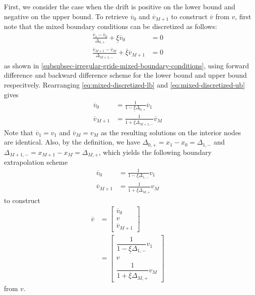 \documentclass[11pt]{article}
\theoremstyle{definition}
\begin{document}
First, we consider the case when the drift is positive on the lower bound and negative on the upper bound. To retrieve $\overline{v}_0 $ and $\overline{v}_{M+1}$ to construct $\overline{v}$ from $v$, first note that the mixed boundary conditions can be discretized as follows:
\begin{align}
\frac{\overline{v}_1 - \overline{v}_0}{\Delta_{0,+}} + \underline{\xi} \overline{v}_0 &= 0 \label{eq:mixed-discretized-lb} \\
\frac{\overline{v}_{M+1} - \overline{v}_M}{\Delta_{M+1,-}} + \overline{\xi} \overline{v}_{M+1} &= 0 \label{eq:mixed-discretized-ub}
\end{align}
as shown in \ref{subsubsec-irregular-grids-mixed-boundary-conditions}, using forward difference and backward difference scheme for the lower bound and upper bound respecitvely. Rearranging \eqref{eq:mixed-discretized-lb} and \eqref{eq:mixed-discretized-ub} gives
\begin{align}
\overline{v}_0 &= \frac{1}{1-\underline{\xi} \Delta_{0,+} } \overline{v}_1 \\
\overline{v}_{M+1} &= \frac{1}{1+\overline{\xi} \Delta_{M+1,-} } \overline{v}_M
\end{align}
Note that $\overline{v}_1 = v_1$ and $\overline{v}_M = v_M$ as the resulting solutions on the interior nodes are identical. Also, by the definition, we have $\Delta_{0,+} = x_1 - x_0 = \Delta_{1,-}$ and $\Delta_{M+1,-} = x_{M+1} - x_M = \Delta_{M, +}$, which yields the following boundary extrapolation scheme
\begin{align}
\overline{v}_0 &= \frac{1}{1-\underline{\xi} \Delta_{1,-} } {v}_1 \\
\overline{v}_{M+1} &= \frac{1}{1+\overline{\xi} \Delta_{M,+} } {v}_M
\end{align}
to construct
\begin{align}
\overline{v} &= \begin{bmatrix}
\overline{v}_0 \\
v  \\
\overline{v}_{M+1}
\end{bmatrix} \\ &=
\begin{bmatrix}
\dfrac{1}{1-\underline{\xi} \Delta_{1,-} } {v}_1 \\
v  \\
\dfrac{1}{1+\overline{\xi} \Delta_{M,+} } {v}_M
\end{bmatrix} 
\end{align}
from $v$.
\end{document}
